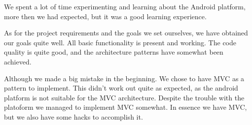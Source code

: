 \documentclass[12pt, a4paper]{article}
\begin{document}
We spent a lot of time experimenting and learning about the Android platform, more then we had expected, but it was a good learning experience. 

As for the project requirements and the goals we set ourselves, we have
obtained our goals quite well. All basic functionality is present and working.
The code quality is quite good, and the architecture patterns have somewhat been
achieved.

Although we made a big mistake in the beginning. We chose to have MVC as a
pattern to implement. This didn't work out quite as expected, as the android platform is not suitable for the MVC architecture. 
Despite the trouble with the platoform we managed to implement MVC somewhat. In
essence we have MVC, but we also have some hacks to accomplish it. 
\end{document}
